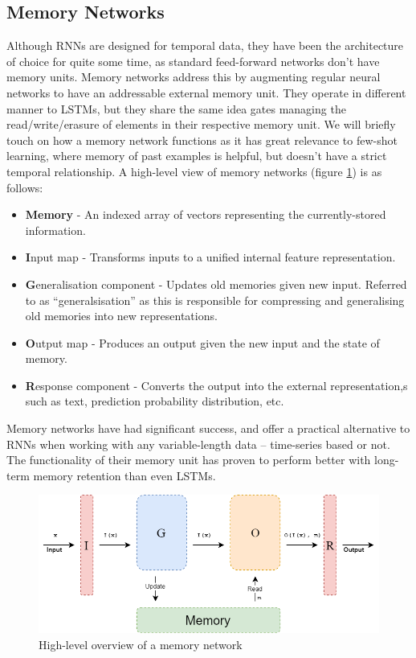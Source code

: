 \documentclass{report}
\begin{document}
	\subsection{Memory Networks}\label{memory-nets:1}
	Although RNNs are designed for temporal data, they have been the architecture of choice for quite some time, as standard feed-forward networks don't have memory units. Memory networks address this by augmenting regular neural networks to have an addressable external memory unit. They operate in different manner to LSTMs, but they share the same idea gates managing the read/write/erasure of elements in their respective memory unit. We will briefly touch on how a memory network functions as it has great relevance to few-shot learning, where memory of past examples is helpful, but doesn't have a strict temporal relationship. A high-level view of memory networks (figure \ref{fig:memory-nets:1}) is as follows:
	\begin{itemize}
		\item \textbf{Memory} - An indexed array of vectors representing the currently-stored information.
		\item \textbf{I}nput map - Transforms inputs to a unified internal feature representation.
		\item \textbf{G}eneralisation component - Updates old memories given new input. Referred to as ``generalsisation'' as this is responsible for compressing and generalising old memories into new representations.
		\item \textbf{O}utput map - Produces an output given the new input and the state of memory.
		\item \textbf{R}esponse component - Converts the output into the external representation,s such as text, prediction probability distribution, etc. 		
	\end{itemize}
	Memory networks have had significant success, and offer a practical alternative to RNNs when working with any variable-length data -- time-series based or not. The functionality of their memory unit has proven to perform better with long-term memory retention than even LSTMs. \par
	\begin{figure}[h]
		\centering
		\includegraphics[width=14cm]{memory-nets}
		\caption{High-level overview of a memory network}
		\label{fig:memory-nets:1}
	\end{figure}
\end{document}

